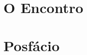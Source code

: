 \documentclass[twoside,openany]{book} %
\begin{document}
\clearpage

\clearpage
\chapter{O Encontro}


\clearpage

\clearpage
\chapter*{Posfácio}


\clearpage

\clearpage
{}
\thispagestyle{empty}

\end{document}
